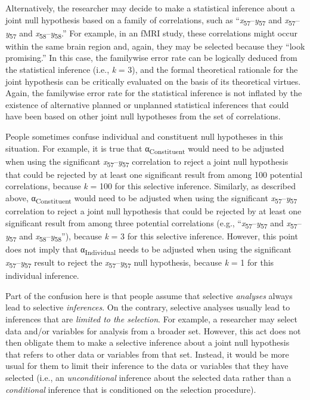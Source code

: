 \documentclass[authordate, empirical]{jote-new-article}
\begin{document}
	Alternatively, the researcher may decide to make a statistical inference about a joint null hypothesis based on a family of correlations, such as “\emph{x}\textsubscript{57}--\emph{y}\textsubscript{57} and\textsubscript{ }\emph{x}\textsubscript{57}--\emph{y}\textsubscript{57} and\textsubscript{ }\emph{x}\textsubscript{58}--\emph{y}\textsubscript{58}.” For example, in an fMRI study, these correlations might occur within the same brain region and, again, they may be selected because they “look promising.” In this case, the familywise error rate can be logically deduced from the statistical inference (i.e., \emph{k} = 3), and the formal theoretical rationale for the joint hypothesis can be critically evaluated on the basis of its theoretical virtues. Again, the familywise error rate for the statistical inference is not inflated by the existence of alternative planned or unplanned statistical inferences that could have been based on other joint null hypotheses from the set of correlations.



	People sometimes confuse individual and constituent null hypotheses in this situation. For example, it is true that α\textsubscript{Constituent }would need to be adjusted when using the significant \emph{x}\textsubscript{57}--\emph{y}\textsubscript{57} correlation to reject a joint null hypothesis that could be rejected by at least one significant result from among 100 potential correlations, because \emph{k} = 100 for this selective inference. Similarly, as described above, α\textsubscript{Constituent }would need to be adjusted when using the significant \emph{x}\textsubscript{57}--\emph{y}\textsubscript{57} correlation to reject a joint null hypothesis that could be rejected by at least one significant result from among three potential correlations (e.g., “\emph{x}\textsubscript{57}--\emph{y}\textsubscript{57} and\textsubscript{ }\emph{x}\textsubscript{57}--\emph{y}\textsubscript{57} and\textsubscript{ }\emph{x}\textsubscript{58}--\emph{y}\textsubscript{58}”), because \emph{k} = 3 for this selective inference. However, this point does not imply that α\textsubscript{Individual} needs to be adjusted when using the significant \emph{x}\textsubscript{57}--\emph{y}\textsubscript{57} result to reject the \emph{x}\textsubscript{57}--\emph{y}\textsubscript{57} null hypothesis, because \emph{k }= 1 for this individual inference.



	Part of the confusion here is that people assume that selective \emph{analyses} always lead to selective \emph{inferences}. On the contrary, selective analyses usually lead to inferences that are \emph{limited to the selection}. For example, a researcher may select data and/or variables for analysis from a broader set. However, this act does not then obligate them to make a selective inference about a joint null hypothesis that refers to other data or variables from that set. Instead, it would be more usual for them to limit their inference to the data or variables that they have selected (i.e., an \emph{unconditional} inference about the selected data rather than a \emph{conditional} inference that is conditioned on the selection procedure).
\end{document}
